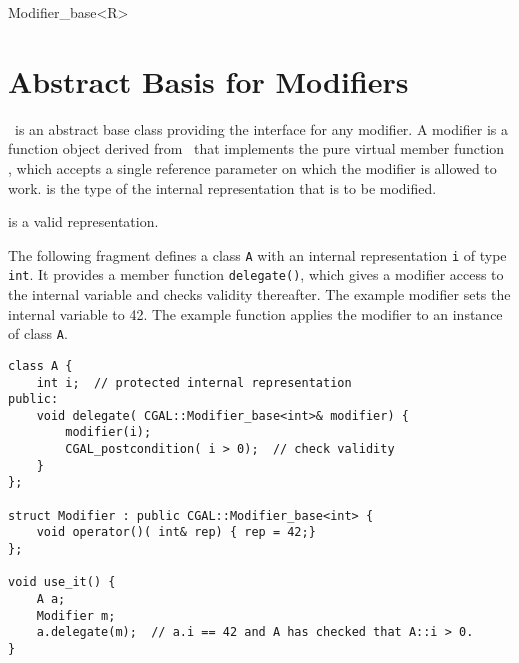 \begin{ccClassTemplate}{Modifier_base<R>}
\section{Abstract Basis for Modifiers}
\label{sectionModifierBase}

\ccDefinition

\ccClassTemplateName\ is an abstract base class providing the
interface for any modifier. A modifier is a function object derived
from \ccClassTemplateName\ that implements the pure virtual member
function , which accepts a single reference parameter
 on which the modifier is allowed to work.   is the
type of the internal representation that is to be modified.


\ccTypes
{}
\ccThreeToTwo


\ccOperations
{}

\ccTagFullDeclarations
{}
    {\ccPostcond {} is a valid representation.}
\ccTagDefaults

\ccExample

The following fragment defines a class {\tt A} with an internal
representation {\tt i} of type {\tt int}. It provides a member
function {\tt delegate()}, which gives a modifier access to the
internal variable and checks validity thereafter.  The
example modifier sets the internal variable to 42. The example
function applies the modifier to an instance of class {\tt A}.

\begin{verbatim}
class A {
    int i;  // protected internal representation
public:
    void delegate( CGAL::Modifier_base<int>& modifier) {
        modifier(i);
        CGAL_postcondition( i > 0);  // check validity
    }
};

struct Modifier : public CGAL::Modifier_base<int> {
    void operator()( int& rep) { rep = 42;}
};

void use_it() {
    A a;
    Modifier m;
    a.delegate(m);  // a.i == 42 and A has checked that A::i > 0.
}
\end{verbatim}

\end{ccClassTemplate}




\ccParDims
\beforecprogskip\parskip
{}



